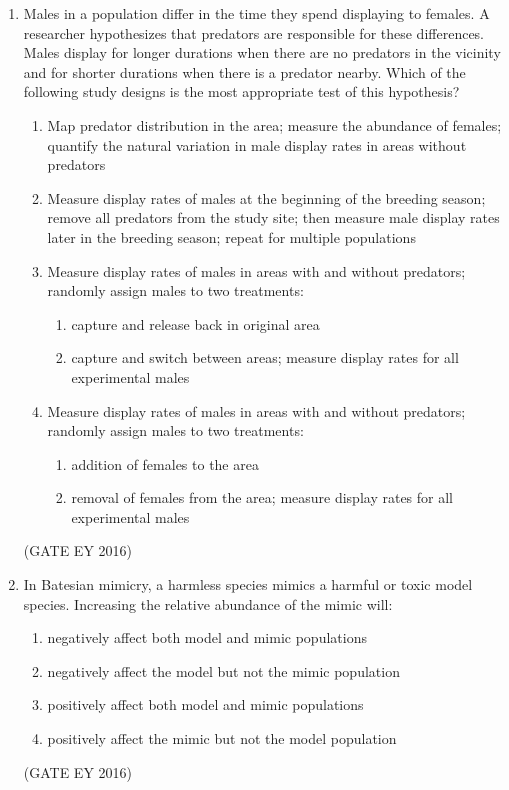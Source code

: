 \documentclass[journal]{IEEEtran}
\begin{document}
\begin{enumerate}[label=Q.\arabic*.]
\item Males in a population differ in the time they spend displaying to females. A researcher hypothesizes that predators are responsible for these differences. Males display for longer durations when there are no predators in the vicinity and for shorter durations when there is a predator nearby. Which of the following study designs is the most appropriate test of this hypothesis?
\begin{enumerate}
    \item Map predator distribution in the area; measure the abundance of females;
quantify the natural variation in male display rates in areas without predators
    \item Measure display rates of males at the beginning of the breeding season;
remove all predators from the study site; then measure male display rates later in the breeding season;
repeat for multiple populations
    \item Measure display rates of males in areas with and without predators;
randomly assign males to two treatments: 
        \begin{enumerate}[label=(\roman*)]
        \item capture and release back in original area
        \item capture and switch between areas; measure display rates for all experimental males
    \end{enumerate}
    \item Measure display rates of males in areas with and without predators;
randomly assign males to two treatments:
        \begin{enumerate}[label=(\roman*)]
        \item addition of females to the area 
        \item removal of females from the area; measure display rates for all experimental males
    \end{enumerate} 
\end{enumerate}
\hfill{(GATE EY 2016)}

\item In Batesian mimicry, a harmless species mimics a harmful or toxic model species. Increasing the relative abundance of the mimic will:
\begin{enumerate}
    \item negatively affect both model and mimic populations
    \item negatively affect the model but not the mimic population
    \item positively affect both model and mimic populations
    \item positively affect the mimic but not the model population
\end{enumerate}
\hfill{(GATE EY 2016)}


\end{enumerate}
\end{document}
